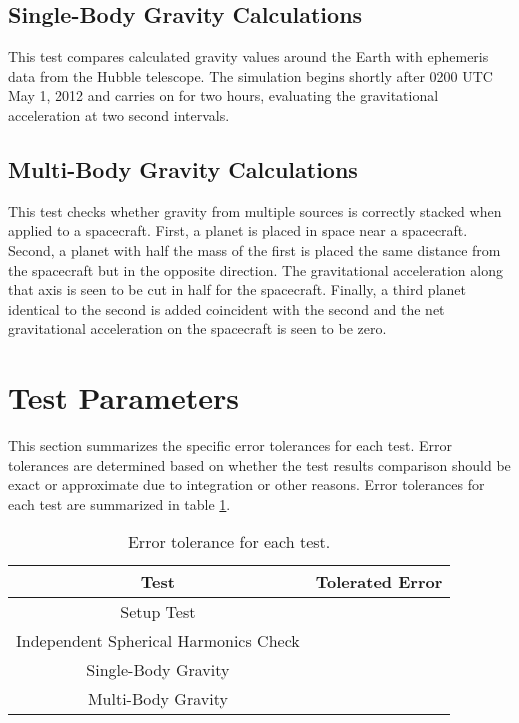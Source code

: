 \subsection{Single-Body Gravity Calculations} This test compares calculated gravity values around the Earth with ephemeris data from the Hubble telescope. The simulation begins shortly after 0200 UTC May 1, 2012 and carries on for two hours, evaluating the gravitational acceleration at two  second intervals.
\subsection{Multi-Body Gravity Calculations} This test checks whether gravity from multiple sources is correctly stacked when applied to a spacecraft. First, a planet is placed in space near a spacecraft. Second, a planet with half the mass of the first is placed the same distance from the spacecraft but in the opposite direction. The gravitational acceleration along that axis is seen to be cut in half for the spacecraft. Finally, a third planet identical to the second is added coincident with the second and the net gravitational acceleration on the spacecraft is seen to be zero. 

\section{Test Parameters}

This section summarizes the  specific error tolerances for each test. Error tolerances are determined based on whether the test results comparison should be exact or approximate due to integration or other reasons. Error tolerances for each test are summarized in table \ref{tab:errortol}. \\

\begin{table}[htbp]
	\caption{Error tolerance for each test.}
	\label{tab:errortol}
	\centering \fontsize{10}{10}\selectfont
	\begin{tabular}{ c | c } %
		\hline
		\textbf{Test}   							    & \textbf{Tolerated Error} 						  \\ \hline
		Setup Test                           			 & 		   \\ \hline
		Independent Spherical Harmonics Check  & 		   \\ \hline
		Single-Body Gravity						   & 														   \\ \hline
		Multi-Body Gravity 						   & 	 		       \\ \hline
	\end{tabular}
\end{table}

